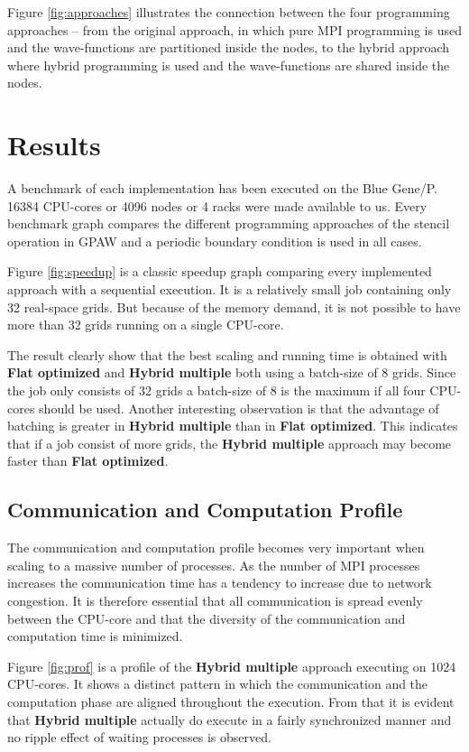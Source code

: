 \documentclass[preprint,3p,times,twocolumn]{elsarticle}
\begin{document}
Figure \ref{fig:approaches} illustrates the connection between the four programming approaches -- from the original approach, in which pure MPI programming is used and the wave-functions are partitioned inside the nodes, to the hybrid approach where hybrid programming is used and the wave-functions are shared inside the nodes.


\section{Results}
A benchmark of each implementation has been executed on the Blue Gene/P. 16384 CPU-cores or 4096 nodes or 4 racks were made available to us. Every benchmark graph compares the different programming approaches of the stencil operation in GPAW and a periodic boundary condition is used in all cases.

Figure \ref{fig:speedup} is a classic speedup graph comparing every implemented approach with a sequential execution. It is a relatively small job containing only 32 real-space grids. But because of the memory demand, it is not possible to have more than 32 grids running on a single CPU-core.

The result clearly show that the best scaling and running time is obtained with \textbf{Flat optimized} and \textbf{Hybrid multiple} both using a batch-size of 8 grids. Since the job only consists of 32 grids a batch-size of 8 is the maximum if all four CPU-cores should be used. Another interesting observation is that the advantage of batching is greater in \textbf{Hybrid multiple} than in \textbf{Flat optimized}. This indicates that if a job consist of more grids, the \textbf{Hybrid multiple} approach may become faster than \textbf{Flat optimized}.

\subsection{Communication and Computation Profile}
The communication and computation profile becomes very important when scaling to a massive number of processes. As the number of MPI processes increases the communication time has a tendency to increase due to network congestion. It is therefore essential that all communication is spread evenly between the CPU-core and that the diversity of the communication and computation time is minimized. 

Figure \ref{fig:prof} is a profile of the \textbf{Hybrid multiple} approach executing on 1024 CPU-cores. It shows a distinct pattern in which the communication and the computation phase are aligned throughout the execution. From that it is evident that \textbf{Hybrid multiple} actually do execute in a fairly synchronized manner and no ripple effect of waiting processes is observed.
\end{document}
